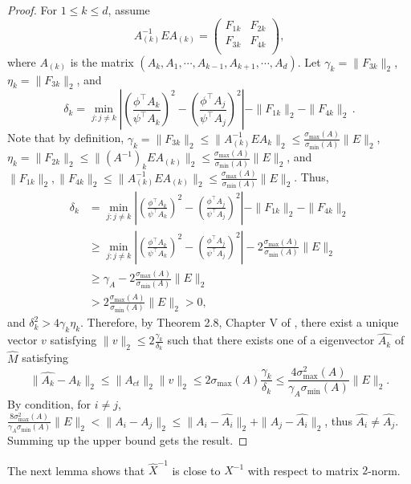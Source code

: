 \begin{proof}
For $1\le k\le d$, assume 
\[
A_{(k)}^{-1} E A_{(k)} =  
\left(
\begin{array}{cc}
F_{1k} & F_{2k}\\
F_{3k} & F_{4k} \\
\end{array} 
\right), 
\]
where $A_{(k)}$ is the matrix $(A_k, A_1, \cdots, A_{k-1}, A_{k+1}, \cdots, A_d)$.
Let $\gamma_k = \|F_{3k}\|_2$, $\eta_k = \|F_{3k}\|_2$, and 
\[
\delta_k = \min_{j: j\neq k} 
\left\vert \left(\frac{\phi^{\top}A_k}{\psi^{\top}A_k}\right)^2 -\left( \frac{\phi^{\top}A_j}{\psi^{\top}A_j}\right)^2 \right\vert - \|F_{1k}\|_2 - \|F_{4k}\|_2\,.
\]
Note that by definition, $\gamma_k = \|F_{3k}\|_2\le\|A_{(k)}^{-1}EA_{k}\|_2\le\frac{\sigma_{\max}(A)}{\sigma_{\min}(A)}\|E\|_2$,
 $\eta_k = \|F_{2k}\|_2\le\|(A^{-1})_kEA_{(k)}\|_2\le\frac{\sigma_{\max}(A)}{\sigma_{\min}(A)}\|E\|_2$, 
 and $\|F_{1k}\|_2,\|F_{4k}\|_2\le\|A_{(k)}^{-1} E A_{(k)}\|_2\le\frac{\sigma_{\max}(A)}{\sigma_{\min}(A)}\|E\|_2$. 
 Thus,
\begin{align*}
\delta_k & = \min_{j:j\neq k} 
	\left\vert \left(\frac{\phi^{\top}A_k}{\psi^{\top}A_k}\right)^2 - \left(\frac{\phi^{\top}A_j}{\psi^{\top}A_j}\right)^2 \right\vert - \|F_{1k}\|_2 - \|F_{4k}\|_2\\
	& \ge \min_{j:j\neq k} \left\vert \left(\frac{\phi^{\top}A_k}{\psi^{\top}A_k}\right)^2 - \left(\frac{\phi^{\top}A_j}{\psi^{\top}A_j}\right)^2 \right\vert - 2 \frac{\sigma_{\max}(A)}{\sigma_{\min}(A)}\|E\|_2\\
	& \ge  \gamma_A -  2 \frac{\sigma_{\max}(A)}{\sigma_{\min}(A)}\|E\|_2 \\
	& >  2 \frac{\sigma_{\max}(A)}{\sigma_{\min}(A)}\|E\|_2 >0,
\end{align*}
and $\delta_k^2 > 4\gamma_k\eta_k$. 
Therefore, by Theorem 2.8, Chapter V of \citep{stewart1990matrix}, there exist a unique vector $v$ satisfying $\|v\|_2\le 2\frac{\gamma_k}{\delta_k}$ such that there exists one of a eigenvector $\widehat{A_k}$ of $\widehat{M}$ satisfying
 \[
 \|\widehat{A_k} - A_k\|_2 \le \|A_{ct}\|_2 \|v\|_2 \le 2\sigma_{\max}(A)\frac{\gamma_k}{\delta_k}
 \le 
 \frac{4\sigma_{\max}^2(A)}{\gamma_A \sigma_{\min}(A) } \|E\|_2.
 \]
 By condition, for $i\neq j$,  $\frac{8\sigma_{\max}^2(A)}{\gamma_A \sigma_{\min}(A) } \|E\|_2 < \|A_i - A_j\|_2\le \|A_i - \widehat{A_i}\|_2 + \|A_j - \widehat{A_i}\|_2$, thus $\widehat{A_i} \neq \widehat{A_j}$.  Summing up the upper bound gets the result. 
\end{proof}
The next lemma shows that $\widehat{X}^{-1}$ is close to $X^{-1}$ with respect to  matrix $2$-norm.
